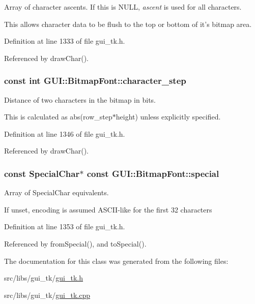 Array of character ascents. If this is N\-U\-L\-L, {\itshape ascent\/} is used for all characters. 

This allows character data to be flush to the top or bottom of it's bitmap area. 

Definition at line 1333 of file gui\-\_\-tk.\-h.



Referenced by draw\-Char().

\hypertarget{classGUI_1_1BitmapFont_a27146558fd76b2ac1c2dc7133b23f4ce}{
\subsubsection[{character\-\_\-step}]{\setlength{\rightskip}{0pt plus 5cm}const int {\bf G\-U\-I\-::\-Bitmap\-Font\-::character\-\_\-step}}}\label{classGUI_1_1BitmapFont_a27146558fd76b2ac1c2dc7133b23f4ce}


Distance of two characters in the bitmap in bits. 

This is calculated as abs(row\-\_\-step$\ast$height) unless explicitly specified. 

Definition at line 1346 of file gui\-\_\-tk.\-h.



Referenced by draw\-Char().

\hypertarget{classGUI_1_1BitmapFont_a46f912c496e902dfc614e25261599718}{
\subsubsection[{special}]{\setlength{\rightskip}{0pt plus 5cm}const {\bf Special\-Char}$\ast$ const {\bf G\-U\-I\-::\-Bitmap\-Font\-::special}}}\label{classGUI_1_1BitmapFont_a46f912c496e902dfc614e25261599718}


Array of Special\-Char equivalents. 

If unset, encoding is assumed A\-S\-C\-I\-I-\/like for the first 32 characters 

Definition at line 1353 of file gui\-\_\-tk.\-h.



Referenced by from\-Special(), and to\-Special().



The documentation for this class was generated from the following files\-:\begin{DoxyCompactItemize}
\item 
src/libs/gui\-\_\-tk/\hyperlink{gui__tk_8h}{gui\-\_\-tk.\-h}\item 
src/libs/gui\-\_\-tk/\hyperlink{gui__tk_8cpp}{gui\-\_\-tk.\-cpp}\end{DoxyCompactItemize}
